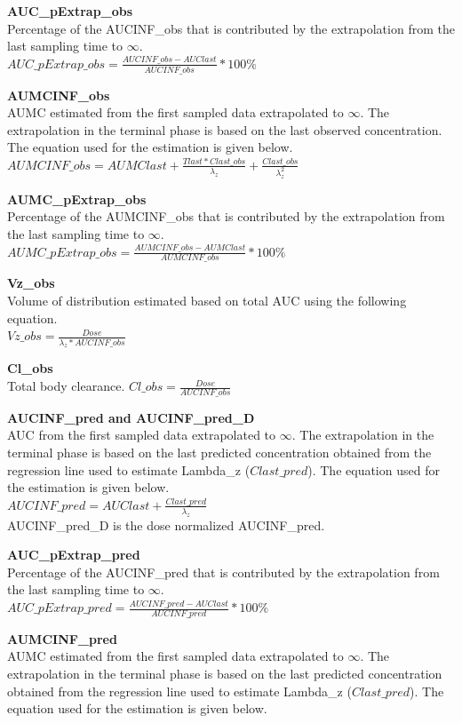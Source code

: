 \documentclass[
  10pt,
]{krantz}
\begin{document}
\textbf{AUC\_pExtrap\_obs}\\
Percentage of the AUCINF\_obs that is contributed by the extrapolation from the last sampling time to \({\infty}\).\\
\(AUC\_pExtrap\_obs = \frac{AUCINF\_obs-AUClast}{AUCINF\_obs}*100\%\)

\textbf{AUMCINF\_obs}\\
AUMC estimated from the first sampled data extrapolated to \({\infty}\). The extrapolation in the terminal phase is based on the last observed concentration. The equation used for the estimation is given below.\\
\(AUMCINF\_obs = AUMClast+\frac{Tlast*Clast\_obs}{\lambda_z}+\frac{Clast\_obs}{\lambda_{z}^2}\)

\textbf{AUMC\_pExtrap\_obs}\\
Percentage of the AUMCINF\_obs that is contributed by the extrapolation from the last sampling time to \({\infty}\).\\
\(AUMC\_pExtrap\_obs = \frac{AUMCINF\_obs-AUMClast}{AUMCINF\_obs}*100\%\)

\textbf{Vz\_obs}\\
Volume of distribution estimated based on total AUC using the following equation.\\
\(Vz\_obs = \frac{Dose}{\lambda_z*AUCINF\_obs}\)

\textbf{Cl\_obs}\\
Total body clearance.
\(Cl\_obs = \frac{Dose}{AUCINF\_obs}\)

\textbf{AUCINF\_pred and AUCINF\_pred\_D}\\
AUC from the first sampled data extrapolated to \({\infty}\). The extrapolation in the terminal phase is based on the last predicted concentration obtained from the regression line used to estimate Lambda\_z (\({Clast\_pred}\)). The equation used for the estimation is given below.\\
\(AUCINF\_pred = AUClast+\frac{Clast\_pred}{\lambda_z}\)\\
AUCINF\_pred\_D is the dose normalized AUCINF\_pred.

\textbf{AUC\_pExtrap\_pred}\\
Percentage of the AUCINF\_pred that is contributed by the extrapolation from the last sampling time to \({\infty}\).\\
\(AUC\_pExtrap\_pred = \frac{AUCINF\_pred-AUClast}{AUCINF\_pred}*100\%\)

\textbf{AUMCINF\_pred}\\
AUMC estimated from the first sampled data extrapolated to \({\infty}\). The extrapolation in the terminal phase is based on the last predicted concentration obtained from the regression line used to estimate Lambda\_z (\({Clast\_pred}\)). The equation used for the estimation is given below.
\end{document}
